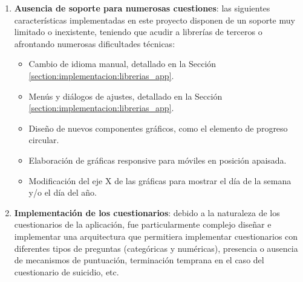 \begin{enumerate}
        \item \textbf{Ausencia de soporte para numerosas cuestiones}: las siguientes características implementadas en este proyecto disponen de un soporte muy limitado o inexistente, teniendo que acudir a librerías de terceros o afrontando numerosas dificultades técnicas:
            \begin{itemize}
                \item Cambio de idioma manual, detallado en la Sección \ref{section:implementacion:librerias_app}.
                \item Menús y diálogos de ajustes, detallado en la Sección \ref{section:implementacion:librerias_app}.
                \item Diseño de nuevos componentes gráficos, como el elemento de progreso circular.
                \item Elaboración de gráficas \gls{responsive} para móviles en posición apaisada.
                \item Modificación del eje X de las gráficas para mostrar el día de la semana y/o el día del año.
            \end{itemize}
        \item \textbf{Implementación de los cuestionarios}: debido a la naturaleza de los cuestionarios de la aplicación, fue particularmente complejo diseñar e implementar una arquitectura que permitiera implementar cuestionarios con diferentes tipos de preguntas (categóricas y numéricas), presencia o ausencia de mecanismos de puntuación, terminación temprana en el caso del cuestionario de suicidio, etc.
    \end{enumerate}




